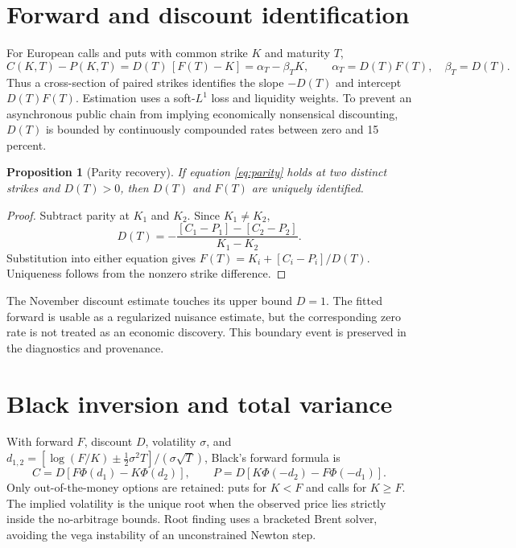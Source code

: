 \documentclass[11pt,oneside]{article}
\newtheorem{proposition}{Proposition}
\begin{document}
\section{Forward and discount identification}

For European calls and puts with common strike $K$ and maturity $T$,
\begin{equation}
  C(K,T)-P(K,T)=D(T)\,[F(T)-K]=\alpha_T-\beta_TK,
  \qquad \alpha_T=D(T)F(T),\quad\beta_T=D(T).
  \label{eq:parity}
\end{equation}
Thus a cross-section of paired strikes identifies the slope $-D(T)$ and intercept
$D(T)F(T)$. Estimation uses a soft-$L^1$ loss and liquidity weights. To prevent an
asynchronous public chain from implying economically nonsensical discounting,
$D(T)$ is bounded by continuously compounded rates between zero and 15 percent.

\begin{proposition}[Parity recovery]
If equation \eqref{eq:parity} holds at two distinct strikes and $D(T)>0$, then
$D(T)$ and $F(T)$ are uniquely identified.
\end{proposition}
\begin{proof}
Subtract parity at $K_1$ and $K_2$. Since $K_1\ne K_2$,
\[
 D(T)=-\frac{[C_1-P_1]-[C_2-P_2]}{K_1-K_2}.
\]
Substitution into either equation gives
$F(T)=K_i+[C_i-P_i]/D(T)$. Uniqueness follows from the nonzero strike difference.
\end{proof}

\begin{table}[ht]
\centering
\caption{Robust put--call-parity estimates. Prices and strikes are index points.}
\resizebox{\textwidth}{!}{}
\end{table}

\begin{riskbox}
The November discount estimate touches its upper bound $D=1$. The fitted forward is
usable as a regularized nuisance estimate, but the corresponding zero rate is not
treated as an economic discovery. This boundary event is preserved in the
diagnostics and provenance.
\end{riskbox}

\section{Black inversion and total variance}

With forward $F$, discount $D$, volatility $\sigma$, and
$d_{1,2}=[\log(F/K)\pm\tfrac12\sigma^2T]/(\sigma\sqrt{T})$, Black's forward formula is
\[
 C=D[F\Phi(d_1)-K\Phi(d_2)],\qquad
 P=D[K\Phi(-d_2)-F\Phi(-d_1)].
\]
Only out-of-the-money options are retained: puts for $K<F$ and calls for $K\ge F$.
The implied volatility is the unique root when the observed price lies strictly
inside the no-arbitrage bounds. Root finding uses a bracketed Brent solver, avoiding
the vega instability of an unconstrained Newton step.
\end{document}
